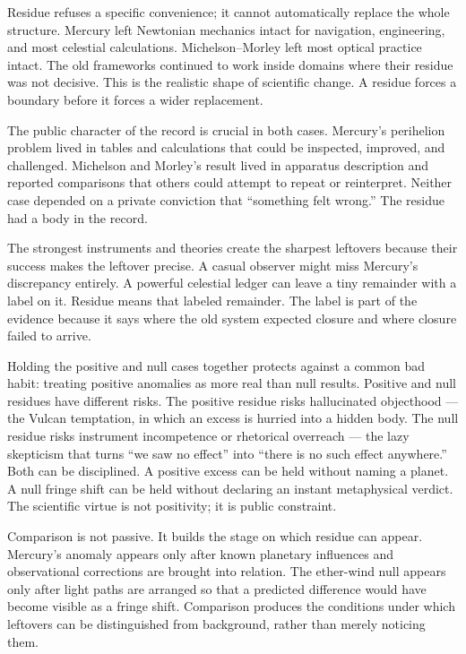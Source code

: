 Residue refuses a specific convenience; it cannot automatically replace
the whole structure. Mercury left Newtonian mechanics intact for
navigation, engineering, and most celestial calculations. Michelson--Morley
left most optical practice intact. The old frameworks
continued to work inside domains where their residue was not decisive.
This is the realistic shape of scientific change. A residue forces a
boundary before it forces a wider replacement.

The public character of the record is crucial in both cases. Mercury's
perihelion problem lived in tables and calculations that could be
inspected, improved, and challenged. Michelson and Morley's result lived
in apparatus description and reported comparisons that others could
attempt to repeat or reinterpret. Neither case depended on a private
conviction that ``something felt wrong.'' The residue had a body in the
record.

The strongest instruments and theories create the sharpest leftovers
because their success makes the leftover precise. A casual observer might
miss Mercury's discrepancy entirely. A powerful celestial ledger can leave
a tiny remainder with a label on it. Residue means that labeled remainder.
The label is part of the evidence because it says where the old system
expected closure and where closure failed to arrive.

Holding the positive and null cases together protects against a common
bad habit: treating positive anomalies as more real than null results.
Positive and null residues have different risks. The positive residue
risks hallucinated objecthood --- the Vulcan temptation, in which an
excess is hurried into a hidden body. The null residue risks instrument
incompetence or rhetorical overreach --- the lazy skepticism that turns
``we saw no effect'' into ``there is no such effect anywhere.'' Both can
be disciplined. A positive excess can be held without naming a planet. A
null fringe shift can be held without declaring an instant metaphysical
verdict. The scientific virtue is not positivity; it is public constraint.

Comparison is not passive. It builds the stage on which residue can
appear. Mercury's anomaly appears only after known planetary influences
and observational corrections are brought into relation. The ether-wind
null appears only after light paths are arranged so that a predicted
difference would have become visible as a fringe shift. Comparison
produces the conditions under which leftovers can be distinguished from
background, rather than merely noticing them.

